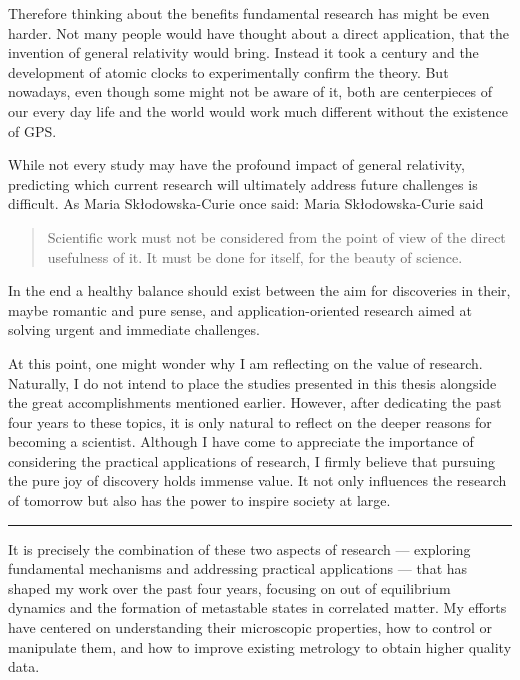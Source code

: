 Therefore thinking about the benefits fundamental research has might be even harder.
Not many people would have thought about a direct application, that the invention of general relativity would bring.
Instead it took a century and the development of atomic clocks to experimentally confirm the theory.
But nowadays, even though some might not be aware of it, both are centerpieces of our every day life and the world would work much different without the existence of GPS.

While not every study may have the profound impact of general relativity, predicting which current research will ultimately address future challenges is difficult.
As Maria Skłodowska-Curie once said:
Maria Skłodowska-Curie said
\begin{quote} 
	\centering 
	 Scientific work must not be considered from the point of view of the direct usefulness of it. It must be done for itself, for the beauty of science.
\end{quote}
In the end a healthy balance should exist between the aim for discoveries in their, maybe romantic and pure sense, and application-oriented research aimed at solving urgent and immediate challenges.

At this point, one might wonder why I am reflecting on the value of research.
Naturally, I do not intend to place the studies presented in this thesis alongside the great accomplishments mentioned earlier.
However, after dedicating the past four years to these topics, it is only natural to reflect on the deeper reasons for becoming a scientist.
Although I have come to appreciate the importance of considering the practical applications of research, I firmly believe that pursuing the pure joy of discovery holds immense value.
It not only influences the research of tomorrow but also has the power to inspire society at large.

\begin{center}
	\rule{0.3\textwidth}{.8pt}
\end{center}

It is precisely the combination of these two aspects of research — exploring fundamental mechanisms and addressing practical applications — that has shaped my work over the past four years, focusing on out of equilibrium dynamics and the formation of metastable states in correlated matter.
My efforts have centered on understanding their microscopic properties, how to control or manipulate them, and how to improve existing metrology to obtain higher quality data.

